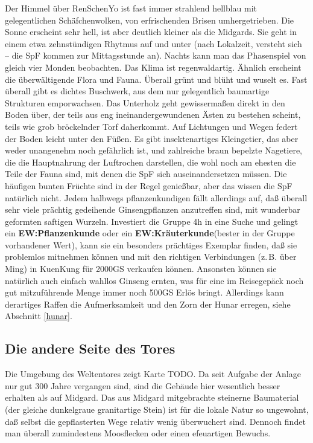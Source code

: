 \documentclass[
a4paper,
twoside,
DIV=calc,
BCOR=4mm,
fontsize=9pt,
twocolumn=on,
titlepage=on,
parskip=half
]{scrartcl}
\begin{document}
Der Himmel über RenSchenYo ist fast immer strahlend hellblau mit
gelegentlichen Schäfchenwolken, von erfrischenden Brisen
umhergetrieben. Die Sonne erscheint sehr hell, ist aber deutlich
kleiner als die Midgards. Sie geht in einem etwa zehnstündigen Rhytmus
auf und unter (nach Lokalzeit, versteht sich -- die SpF kommen zur
Mittagsstunde an). Nachts kann man das Phasenspiel von gleich vier
Monden beobachten. Das Klima ist regenwaldartig. Ähnlich erscheint die
überwältigende Flora und Fauna. Überall grünt und blüht und wuselt
es. Fast überall gibt es dichtes Buschwerk, aus dem nur gelegentlich
baumartige Strukturen emporwachsen. Das Unterholz geht gewissermaßen
direkt in den Boden über, der teils aus eng ineinandergewundenen Ästen
zu bestehen scheint, teils wie grob bröckelnder Torf daherkommt. Auf
Lichtungen und Wegen federt der Boden leicht unter den Füßen. Es gibt
insektenartiges Kleingetier, das aber weder unangenehm noch gefährlich
ist, und zahlreiche braun bepelzte Nagetiere, die die Hauptnahrung der
Luftrochen darstellen, die wohl noch am ehesten die Teile der Fauna
sind, mit denen die SpF sich auseinandersetzen müssen. Die häufigen
bunten Früchte sind in der Regel genießbar, aber das wissen die SpF
natürlich nicht. Jedem halbwegs pflanzenkundigen fällt allerdings auf,
daß überall sehr viele prächtig gedeihende Ginsengpflanzen anzutreffen
sind, mit wunderbar geformten saftigen Wurzeln. Investiert die Gruppe
4h in eine Suche und gelingt ein \textbf{EW:Pflanzenkunde} oder ein
\textbf{EW:Kräuterkunde}(bester in der Gruppe vorhandener Wert), kann
sie ein besonders prächtiges Exemplar finden, daß sie problemlos
mitnehmen können und mit den richtigen Verbindungen (z.\,B. über Ming)
in KuenKung für 2000GS verkaufen können. Ansonsten können sie
natürlich auch einfach wahllos Ginseng ernten, was für eine im
Reisegepäck noch gut mitzuführende Menge immer noch 500GS Erlös
bringt. Allerdings kann derartiges Raffen die Aufmerksamkeit und den
Zorn der Hunar erregen, siehe Abschnitt \ref{hunar}.

\subsection{Die andere Seite des Tores}

Die Umgebung des Weltentores zeigt Karte TODO. Da seit Aufgabe der
Anlage nur gut 300 Jahre vergangen sind, sind die Gebäude hier
wesentlich besser erhalten als auf Midgard. Das aus Midgard
mitgebrachte steinerne Baumaterial (der gleiche dunkelgraue
granitartige Stein) ist für die lokale Natur so ungewohnt, daß selbst
die gepflasterten Wege relativ wenig überwuchert sind. Dennoch findet
man überall zumindestens Moosflecken oder einen efeuartigen Bewuchs.
\end{document}
